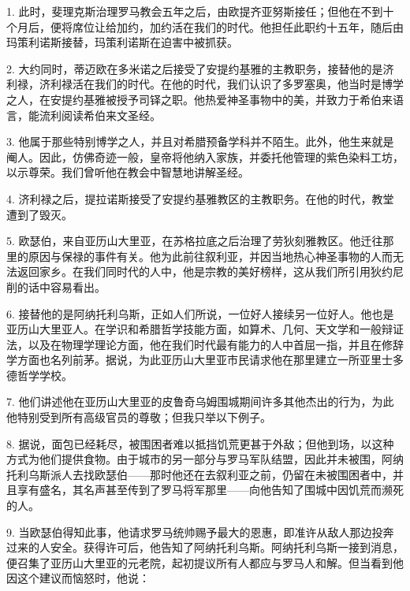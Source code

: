 1. 此时，斐理克斯治理罗马教会五年之后，由欧提齐亚努斯接任；但他在不到十个月后，便将席位让给加约，加约活在我们的时代。他担任此职约十五年，随后由玛策利诺斯接替，玛策利诺斯在迫害中被抓获。\par

2. 大约同时，蒂迈欧在多米诺之后接受了安提约基雅的主教职务，接替他的是济利禄，济利禄活在我们的时代。在他的时代，我们认识了多罗塞奥，他当时是博学之人，在安提约基雅被授予司铎之职。他热爱神圣事物中的美，并致力于希伯来语言，能流利阅读希伯来文圣经。\par

3. 他属于那些特别博学之人，并且对希腊预备学科并不陌生。此外，他生来就是阉人。因此，仿佛奇迹一般，皇帝将他纳入家族，并委托他管理的紫色染料工坊，以示尊荣。我们曾听他在教会中智慧地讲解圣经。\par

4. 济利禄之后，提拉诺斯接受了安提约基雅教区的主教职务。在他的时代，教堂遭到了毁灭。\par

5. 欧瑟伯，来自亚历山大里亚，在苏格拉底之后治理了劳狄刻雅教区。他迁往那里的原因与保禄的事件有关。他为此前往叙利亚，并因当地热心神圣事物的人而无法返回家乡。在我们同时代的人中，他是宗教的美好榜样，这从我们所引用狄约尼削的话中容易看出。\par

6. 接替他的是阿纳托利乌斯，正如人们所说，一位好人接续另一位好人。他也是亚历山大里亚人。在学识和希腊哲学技能方面，如算术、几何、天文学和一般辩证法，以及在物理学理论方面，他在我们时代最有能力的人中首屈一指，并且在修辞学方面也名列前茅。据说，为此亚历山大里亚市民请求他在那里建立一所亚里士多德哲学学校。\par

7. 他们讲述他在亚历山大里亚的皮鲁奇乌姆围城期间许多其他杰出的行为，为此他特别受到所有高级官员的尊敬；但我只举以下例子。\par

8. 据说，面包已经耗尽，被围困者难以抵挡饥荒更甚于外敌；但他到场，以这种方式为他们提供食物。由于城市的另一部分与罗马军队结盟，因此并未被围，阿纳托利乌斯派人去找欧瑟伯——那时他还在去叙利亚之前，仍留在未被围困者中，并且享有盛名，其名声甚至传到了罗马将军那里——向他告知了围城中因饥荒而濒死的人。\par

9. 当欧瑟伯得知此事，他请求罗马统帅赐予最大的恩惠，即准许从敌人那边投奔过来的人安全。获得许可后，他告知了阿纳托利乌斯。阿纳托利乌斯一接到消息，便召集了亚历山大里亚的元老院，起初提议所有人都应与罗马人和解。但当看到他因这个建议而恼怒时，他说：\par

